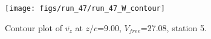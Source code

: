\begin{figure}[H]
\centering
\texttt{[image: figs/run\_47/run\_47\_W\_contour]}
\caption{Contour plot of $\overline{v_{z}}$ at $z/c$=9.00, $V_{free}$=27.08, station 5.}
\label{fig:run_47_W_contour}
\end{figure}


